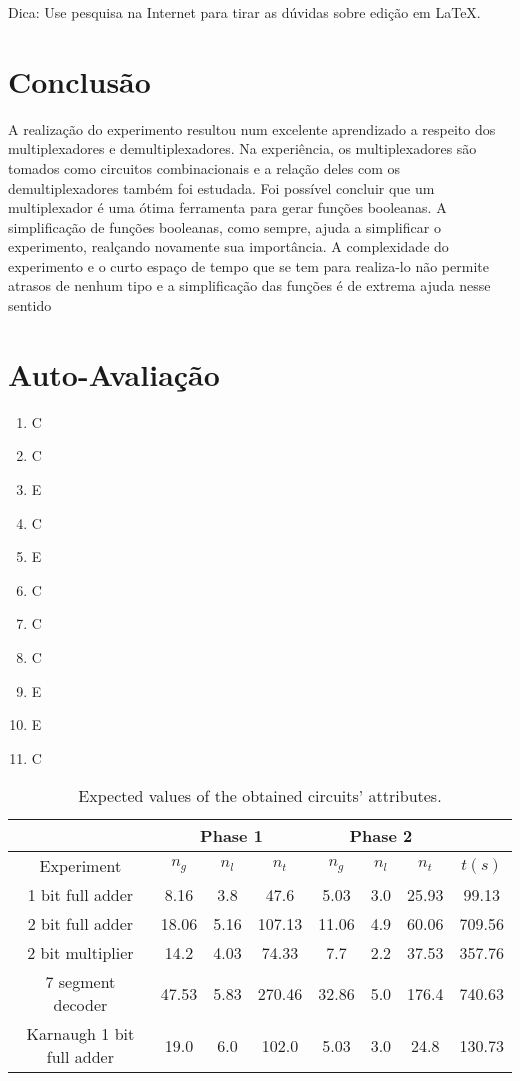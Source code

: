 \documentclass[12pt]{article}
\begin{document}
Dica: Use pesquisa na Internet para tirar as dúvidas sobre edição em \LaTeX .

\section{Conclusão}
\label{sec:Conclusao}

A realização do experimento resultou num excelente aprendizado a respeito dos multiplexadores e demultiplexadores. Na experiência, os multiplexadores são tomados como circuitos combinacionais e a relação deles com os demultiplexadores também foi estudada.
Foi possível concluir que um multiplexador é uma ótima ferramenta para gerar funções booleanas. A simplificação de funções booleanas, como sempre, ajuda a simplificar o experimento, realçando novamente sua importância. A complexidade do experimento e o curto espaço de tempo que se tem para realiza-lo não permite atrasos de nenhum tipo e a simplificação das funções é de extrema ajuda nesse sentido

\newpage 
\section*{Auto-Avaliação}

\begin{enumerate}
    \item C
    \item C
    \item E
    \item C
    \item E
    \item C
    \item C
    \item C
    \item E
    \item E
    \item C
\end{enumerate}

\begin{table}[H]
	\centering
	\caption{Expected values of the obtained circuits' attributes.}
	\begin{tabular}{|c|c|c|c|c|c|c|c|}
		\cline{2-7}
		\multicolumn{1}{c}{} & \multicolumn{3}{|c|}{Phase 1} & \multicolumn{3}{c|}{Phase 2} & \multicolumn{1}{c}{} \\
		\hline
		Experiment & $n_g$ & $n_l$ & $n_t$ & $n_g$ & $n_l$ & $n_t$ & $t(s)$ \\
		\hline
		1 bit full adder & 8.16 & 3.8 & 47.6 & 5.03 & 3.0 & 25.93 & 99.13 \\
		2 bit full adder & 18.06 & 5.16 & 107.13 & 11.06 & 4.9 & 60.06 & 709.56 \\
		2 bit multiplier & 14.2 & 4.03 & 74.33 & 7.7 & 2.2 & 37.53 & 357.76 \\
		7 segment decoder & 47.53 & 5.83 & 270.46 & 32.86 & 5.0 & 176.4 & 740.63 \\
		Karnaugh 1 bit full adder & 19.0 & 6.0 & 102.0 & 5.03 & 3.0 & 24.8 & 130.73 \\
		\hline
	\end{tabular}
	\label{tab:resultados}
\end{table}
\end{document}
